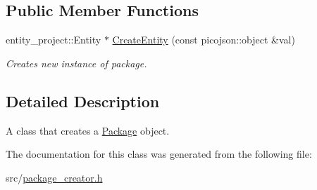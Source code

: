 \subsection*{Public Member Functions}
\begin{DoxyCompactItemize}
\item 
\mbox{\label{classcsci3081_1_1PackageCreator_ab10a0e955c3b726cab5630e5a2b3b5bb}} 
entity\+\_\+project\+::\+Entity $\ast$ \hyperlink{classcsci3081_1_1PackageCreator_ab10a0e955c3b726cab5630e5a2b3b5bb}{Create\+Entity} (const picojson\+::object \&val)
\begin{DoxyCompactList}\small\item\em Creates new instance of package. \end{DoxyCompactList}\end{DoxyCompactItemize}


\subsection{Detailed Description}
A class that creates a \hyperlink{classcsci3081_1_1Package}{Package} object. 

The documentation for this class was generated from the following file\+:\begin{DoxyCompactItemize}
\item 
src/\hyperlink{package__creator_8h}{package\+\_\+creator.\+h}\end{DoxyCompactItemize}
